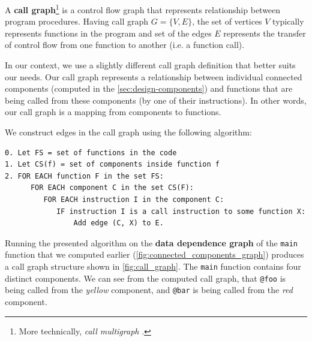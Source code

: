 \documentclass[12pt, twoside]{fithesis2}
\renewcommand{\_}{\leavevmode \kern0.07em\vbox{\hrule width0.4em}}
\begin{document}
A \textbf{call graph}\footnote{
More technically, \emph{call multigraph} \cite{data_flow}.}
is a control flow graph that represents relationship
between program procedures\cite{data_flow}.
Having call graph $G = \{V, E\}$, the set of vertices $V$ typically represents
functions in the program and set of the edges $E$ represents the transfer of
control flow from one function to another (i.e. a function call).

In our context, we use a slightly different call graph definition that better
suits our needs.
Our call graph represents a relationship between individual
connected components (computed in the \autoref{sec:design-components})
and functions that are being called from these components (by one of their
instructions).
In other words, our call graph is a mapping from components to
functions.

We construct edges in the call graph using the following algorithm:

\begin{verbatim}
0. Let FS = set of functions in the code
1. Let CS(f) = set of components inside function f
2. FOR EACH function F in the set FS:
      FOR EACH component C in the set CS(F):
         FOR EACH instruction I in the component C:
            IF instruction I is a call instruction to some function X:
                Add edge (C, X) to E.
\end{verbatim}

Running the presented algorithm on the \textbf{data dependence graph}
of the \texttt{main} function that we computed earlier
(\autoref{fig:connected_components_graph}) produces a call graph structure
shown in \autoref{fig:call_graph}.
The \texttt{main} function contains four distinct components.
We can see from the computed call graph, that \texttt{@foo} is being
called from the \emph{yellow} component, and \texttt{@bar} is being
called from the \emph{red} component.
\end{document}
